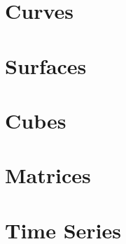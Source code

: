 \section{Curves}

\section{Surfaces}

\section{Cubes}

\section{Matrices}

\section{Time Series}



